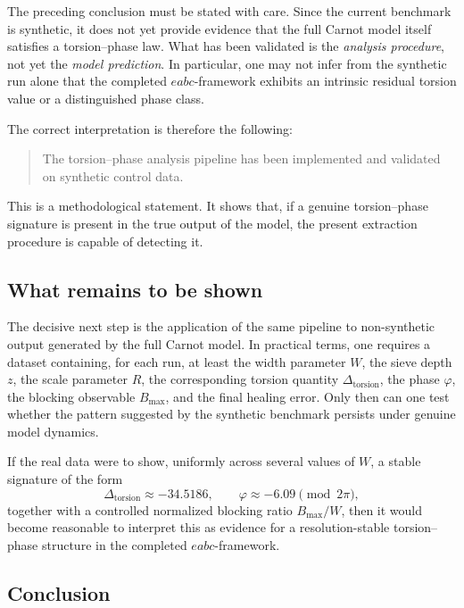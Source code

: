 \documentclass[11pt,a4paper]{article}
\begin{document}
	The preceding conclusion must be stated with care. Since the current benchmark is synthetic, it does not yet provide evidence that the full Carnot model itself satisfies a torsion--phase law. What has been validated is the \emph{analysis procedure}, not yet the \emph{model prediction}. In particular, one may not infer from the synthetic run alone that the completed \(eabc\)-framework exhibits an intrinsic residual torsion value or a distinguished phase class.
	
	The correct interpretation is therefore the following:
	\begin{quote}
		The torsion--phase analysis pipeline has been implemented and validated on synthetic control data.
	\end{quote}
	This is a methodological statement. It shows that, if a genuine torsion--phase signature is present in the true output of the model, the present extraction procedure is capable of detecting it.
	
	\subsection{What remains to be shown}
	
	The decisive next step is the application of the same pipeline to non-synthetic output generated by the full Carnot model. In practical terms, one requires a dataset containing, for each run, at least the width parameter \(W\), the sieve depth \(z\), the scale parameter \(R\), the corresponding torsion quantity \(\Delta_{\mathrm{torsion}}\), the phase \(\varphi\), the blocking observable \(B_{\max}\), and the final healing error. Only then can one test whether the pattern suggested by the synthetic benchmark persists under genuine model dynamics.
	
	If the real data were to show, uniformly across several values of \(W\), a stable signature of the form
	\begin{equation}\label{eq:target-signature}
		\Delta_{\mathrm{torsion}}\approx -34.5186,
		\qquad
		\varphi \approx -6.09 \pmod{2\pi},
	\end{equation}
	together with a controlled normalized blocking ratio \(B_{\max}/W\), then it would become reasonable to interpret this as evidence for a resolution-stable torsion--phase structure in the completed \(eabc\)-framework.
	
	\subsection{Conclusion}
	
\end{document}
